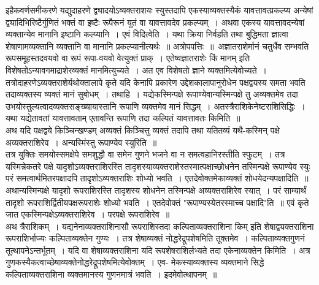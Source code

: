 \documentclass[11pt, openany]{book}
\begin{document}
\vspace{-3mm}
 इहैकवर्णसमीकरणे यद्युदाहरणे द्व्यादयोऽव्यक्तराशयः स्युस्तदापि एकस्याव्यक्तस्यैकं यावत्तावत्प्रकल्प्य अन्येषां द्व्यादिभिरिष्टैर्गुणितं भक्तं वा इष्टैः 
रूपैरूनं युतं वा यावत्तावदेव प्रकल्प्यम्~। अथवा एकस्य यावत्तावदन्येषां
व्यक्तान्येव मानानि इष्टानि कल्प्यानि~। एवं विदित्वेति~। यथा क्रिया 
निर्वहति तथा बुद्धिमता ज्ञात्वा शेषाणामव्यक्तानि व्यक्तानि वा मानानि 
प्रकल्प्यानीत्यर्थः~॥
\newpage
 अत्रोपपत्तिः~॥~अज्ञातराशेर्मानं चतुर्धैव सम्भवति रूपसमूहस्तदवयवो 
वा रूपं रूपा-वयवो वेत्युक्तं प्राक्~। एतेष्वज्ञातराशेः किं मानम् इति विशेषतोऽन्यावगमाद्राशेरव्यक्तं मानमित्युच्यते~। अत एव विशेषतो ज्ञाने व्यक्तमित्येवोच्यते~। तत्रोदाहरणेऽव्यक्तराशेर्यथोक्तालापे कृते यदि केनापि प्रकारेण 
उद्देशकालापानुरोधेन पक्षद्वयस्य समता भवति तदाव्यक्तस्य व्यक्तं मानं 
सुबोधम्~। तथाहि~। यद्येकस्मिन्पक्षे रूपाण्येवान्यस्मिन्पक्षे तु अव्यक्तमेव तदा 
उभयोस्तुल्यत्वादव्यक्तसङ्ख्यायास्तानि रूपाणि व्यक्तमेव मानं सिद्धम्~। अतस्त्रैराशिकेनेष्टराशिसिद्धिः~। यथा यद्येतावतां यावत्तावताम् एतावन्ति रूपाणि तदा 
कल्पितं यावत्तावतः किमिति~॥~\\

\vspace{-3mm}
 अथ यदि पक्षद्वये किञ्चिन्खण्डम् अव्यक्तं किञ्चित्तु व्यक्तं तदापि तथा 
यतितव्यं यथै-कस्मिन् पक्षे अव्यक्तराशिरेव~। अन्यस्मिंस्तु रूपाण्येव 
स्युरिति~॥~\\

\vspace{-3mm}
 तत्र युक्तिः समयोस्समक्षेपे समशुद्धौ वा समेन गुणने भजने वा 
न समत्वहानिरस्तीति स्फुटम्~। तत्र यस्मिन्नेकतरे पक्षे
यादृशोऽव्यक्तराशिरस्ति तादृशस्याव्यक्तराशेस्तस्मात्पक्षाच्छोधनेन तस्मिन्पक्षे रूपाण्येव
स्युः परं समत्वार्थमितरपक्षादपि तादृशोऽव्यक्तराशिः शोध्यो भवति~।
एतदेवोक्तमेकाव्यक्तं शोधयेदन्यपक्षादिति~॥ अथान्यस्मिन्पक्षे यादृशो रूपराशिरस्ति तादृशस्य शोधनेन तस्मिन्पक्षे अव्यक्तराशिरेव स्यात्~। परं साम्यार्थं तादृशो
रूपराशिर्द्वितीयपक्षरूपराशेः शोध्यो भवति~। एतदेवोक्तं {\qt "रूपाण्यस्येतरस्माच्च पक्षादि"}ति~॥ एवं कृते जात एकस्मिन्पक्षेऽव्यक्तराशिरेव~। परपक्षे रूपराशिरेव~॥~\\

\vspace{-3mm}
 अथ त्रैराशिकम्~। यद्यनेनाव्यक्तराशिनासौ रूपराशिस्तदा कल्पिताव्यक्तराशिना किम् इति शेषाद्व्यक्तराशिना रूपराशिर्भाज्यः कल्पिताव्यक्तेन गुण्यः~। तत्र शेषाव्यक्तं नोद्धरेद्रूपशेषमिति तूक्तमेव~। कल्पिताव्यक्तगुणनं तूत्थापनेऽन्तर्भूतम्~। यदि वा शेषाव्यक्तराशिना यदि रूपशेषराशिर्लभ्यते तदा एकेनाव्यक्तेन किमिति~। अत्र
गुणकस्यैकत्वाच्छेषाव्यक्तेनोद्धरेद्रूपशेषमित्येवोक्तम्~। एव-
\newpage
\noindent मेकस्याव्यक्तस्य व्यक्तमाने सिद्धे कल्पिताव्यक्तराशिना व्यक्तमानस्य
गुणनमात्रं भवति~। इदमेवोत्थापनम्~॥~\\
\end{document}
